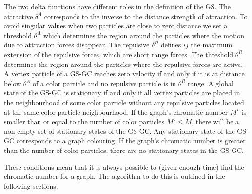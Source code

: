 The two delta functions have different roles in the definition of the GS. The attractive $\delta^A$ corresponds to the inverse to the distance strength of attraction. To avoid singular values when two particles are close to zero distance we set a threshold $\theta^A$ which determines the region around the particles where the motion due to attraction forces disappear. The repulsive $\delta^R$ defines $ij$ the maximum extension of the repulsive forces, which are short range forces. The threshold $\theta^R$ determines the region around the particles where the repulsive forces are active.
A vertex particle of a GS-GC reaches zero velocity if and only if it is at distance below $\theta^A$ of a color particle and no repulsive particle is in $\theta^R$ range.
A global state of the GS-GC is stationary if and only if all vertex particles are placed in the neighbourhood of some color particle without any repulsive particles located at the same color particle neighbourhood.
If the graph's chromatic number $M^\star$ is smaller than or equal to the number of color particles $M^\star \leq M$, there will be a non-empty set of stationary states of the GS-GC.
Any stationary state of the GS-GC corresponds to a graph colouring.
If the graph's chromatic number is greater than the number of color particles, there are no stationary states in the GS-GC.

These conditions mean that it is always possible to (given enough time) find the chromatic number for a graph. The algorithm to do this is outlined in the following sections.
